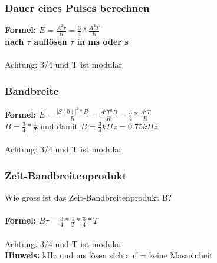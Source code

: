 \subsubsection{Dauer eines Pulses berechnen}
\textbf{Formel:} $E=\frac{A^2\tau}{R}=\frac{3}{4}*\frac{A^2T}{R}$ \\
\textbf{nach $\tau$ auflösen $\tau$ in ms oder s}\\
\\
Achtung: 3/4 und T ist modular

\subsubsection{Bandbreite}
\textbf{Formel:} $E=\frac{|S(0)|^2*B}{R}=\frac{A^2T^2B}{R}=\frac{3}{4}*\frac{A^2T}{R}$\\ $B=\frac{3}{4}*\frac{1}{T}$ und damit $B=\frac{3}{4}kHz=0.75kHz$\\
\\
Achtung: 3/4 und T ist modular

\subsubsection{Zeit-Bandbreitenprodukt}
Wie gross ist das Zeit-Bandbreitenprodukt B\tau ?\\
\\
\textbf{Formel:} $B\tau=\frac{3}{4}*\frac{1}{T}*\frac{3}{4}*T$
\\
\\
Achtung: 3/4 und T ist modular
\\
\textbf{Hinweis:} kHz und ms lösen sich auf = keine Masseinheit










